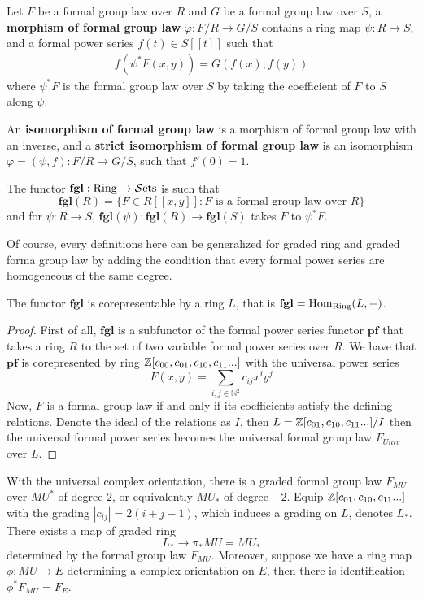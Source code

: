 \begin{definition}
    Let $F$ be a formal group law over $R$ and $G$ be a formal group law over $S$, a \textbf{morphism of formal group law} $\varphi: F/R\to G/S$ contains a ring map $\psi: R\to S$, and a formal power series $f(t)\in S[[t]]$ such that 
    \begin{align*}
        f(\psi^*F(x,y))=G(f(x),f(y))
    \end{align*}
    where $\psi^*F$ is the formal group law over $S$ by taking the coefficient of $F$ to $S$ along $\psi$.  

    An \textbf{isomorphism of formal group law} is a morphism of formal group law with an inverse, and a \textbf{strict isomorphism of formal group law} is an isomorphism $\varphi=(\psi, f): F/R\to G/S$, such that $f'(0)=1$.
\end{definition}


\begin{definition}
    The functor $\mathbf{fgl}: \mathrm{Ring}\to \operatorname{\mathcal{S}ets}$ is such that 
    \[
    \mathbf{fgl}(R)=\{F\in R[[x,y]]: F \text{ is a formal group law over $R$}\}
    \]and for $\psi: R\to S$, $\mathbf{fgl}(\psi):\mathbf{fgl}(R)\to \mathbf{fgl}(S)$ takes $F$ to $\psi^*F$.

\end{definition}
Of course, every definitions here can be generalized for graded ring and graded forma group law by adding the condition that every formal power series are homogeneous of the same degree.
\begin{proposition}
\cite{ChrHopkins}
The functor $\mathbf{fgl}$ is corepresentable by a ring $L$, that is $\operatorname{\mathbf{fgl}}=\operatorname{Hom}_{\mathrm{Ring}}(L,-)$.
\end{proposition}
\begin{proof}
    First of all, $\mathbf{fgl}$ is a subfunctor of the formal power series functor $\mathbf{pf}$ that takes a ring $R$ to the set of two variable formal power series over $R$. We have that $\mathbf{pf}$ is corepresented by ring $\mathbb{Z}[c_{00},c_{01},c_{10}, c_{11}...]$ with the universal power series
    \[
    F(x,y)=\sum_{i,j\in \mathbb{N}^2}c_{ij}x^iy^j
    \] Now, $F$ is a formal group law if and only if its coefficients satisfy the defining relations. Denote the ideal of the relations as $I$, then $L=\mathbb{Z}[c_{01},c_{10}, c_{11}...]/I$ then the universal formal power series becomes the universal formal group law $F_{Univ}$ over $L$.
\end{proof}


With the universal complex orientation, there is a graded formal group law $F_{MU}$ over $MU^*$ of degree $2$, or equivalently $MU_*$ of degree $-2$. Equip $\mathbb{Z}[c_{01},c_{10}, c_{11}...]$ with the grading $|c_{ij}|=2(i+j-1)$, which induces a grading on $L$, denotes $L_*$. There exists a map of graded ring 
\[
L_*\to \pi_*MU=MU_*
\]determined by the formal group law $F_{MU}$. Moreover, suppose we have a ring map $\phi:MU\to E$ determining a complex orientation on $E$, then there is identification $\phi^*F_{MU}=F_E$.

